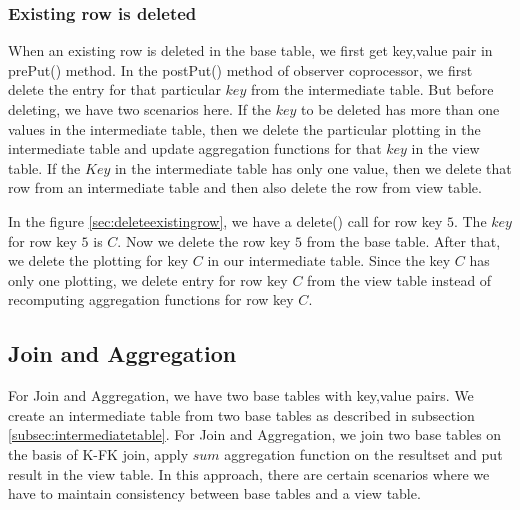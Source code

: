 \documentclass[11pt,a4paper,bibtotoc,idxtotoc,headsepline,footsepline,footexclude,BCOR12mm,DIV13]{scrbook}
\begin{document}
\newpage
\subsubsection{Existing row is deleted}
\label{subsubsec:rowdelete}

When an existing row is deleted in the base table, we first get key,value pair in prePut() method. In the postPut() method of observer coprocessor, we first delete the entry for that particular $key$ from the intermediate table. But before deleting, we have two scenarios here. If the $key$ to be deleted has more than one values in the intermediate table, then we delete the particular plotting in the intermediate table and update aggregation functions for that $key$ in the view table. If the $Key$ in the intermediate table has only one value, then we delete that row from an intermediate table and then also delete the row from view table.

In the figure \ref{sec:deleteexistingrow}, we have a delete() call for row key $5$. The $key$ for row key $5$ is $C$. Now we delete the row key $5$ from the base table. After that, we delete the plotting for key $C$ in our intermediate table. Since the key $C$ has only one plotting, we delete entry for row key $C$ from the view table instead of recomputing aggregation functions for row key $C$. 

\subsection{Join and Aggregation}
\label{subsec:joinandaggregation}

For Join and Aggregation, we have two base tables with key,value pairs. We create an intermediate table from two base tables as described in subsection \ref{subsec:intermediatetable}. For Join and Aggregation, we join two base tables on the basis of K-FK join, apply $sum$ aggregation function on the resultset and put result in the view table. In this approach, there are certain scenarios where we have to maintain consistency between base tables and a view table.

\end{document}
